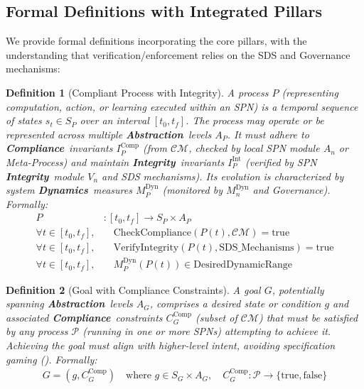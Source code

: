 \documentclass[12pt,a4paper]{report}
\renewcommand{\citep}[1]{\textit{\scriptsize{(\cite{#1})}}}
\newtheorem{definition}{Definition}[section]
\newcommand{\Compliance}{\textbf{Compliance}}
\newcommand{\Integrity}{\textbf{Integrity}}
\newcommand{\Abstraction}{\textbf{Abstraction}}
\newcommand{\Dynamics}{\textbf{Dynamics}}
\begin{document}
	\subsection{Formal Definitions with Integrated Pillars}
	\label{sec:2-2-2}
	
	We provide formal definitions incorporating the core pillars, with the understanding that verification/enforcement relies on the SDS and Governance mechanisms:
	
	\begin{definition}[Compliant Process with Integrity]
		\label{def:compliant_process}
		A process $P$ (representing computation, action, or learning executed within an SPN) is a temporal sequence of states $s_t \in S_P$ over an interval $[t_0, t_f]$. The process may operate or be represented across multiple \Abstraction\ levels $A_P$. It must adhere to \Compliance\ invariants $I_P^{\text{Comp}}$ (from $\mathcal{CM}$, checked by local SPN module $A_n$ or Meta-Process) and maintain \Integrity\ invariants $I_P^{\text{Int}}$ (verified by SPN \Integrity\ module $V_n$ and SDS mechanisms). Its evolution is characterized by system \Dynamics\ measures $M_P^{\text{Dyn}}$ (monitored by $M_n^{\text{Dyn}}$ and Governance). Formally:
		\begin{align}
			P &: [t_0, t_f] \rightarrow S_P \times A_P \\
			\forall t \in [t_0, t_f], &\quad \text{CheckCompliance}(P(t), \mathcal{CM}) = \text{true} \label{eq:proc_comp} \\
			\forall t \in [t_0, t_f], &\quad \text{VerifyIntegrity}(P(t), \text{SDS\_Mechanisms}) = \text{true} \label{eq:proc_int} \\
			\forall t \in [t_0, t_f], &\quad M_P^{\text{Dyn}}(P(t)) \in \text{DesiredDynamicRange} \label{eq:proc_dyn}
		\end{align}
	\end{definition}
	
	\begin{definition}[Goal with Compliance Constraints]
		\label{def:compliant_goal}
		A goal $G$, potentially spanning \Abstraction\ levels $A_G$, comprises a desired state or condition $g$ and associated \Compliance\ constraints $C_G^{\text{Comp}}$ (subset of $\mathcal{CM}$) that must be satisfied by any process $\mathcal{P}$ (running in one or more SPNs) attempting to achieve it. Achieving the goal must align with higher-level intent, avoiding specification gaming \citep{Kovac2025SpecGaming}. Formally:
		\begin{align}
			G = (g, C_G^{\text{Comp}}) \quad \text{where } g \in S_G \times A_G, \quad C_G^{\text{Comp}}: \mathcal{P} \rightarrow \{\text{true}, \text{false}\}
		\end{align}
	\end{definition}
	
\end{document}
